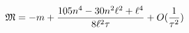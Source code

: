 \begin{equation}
{\frak M}=-m+\frac{105n^{4}-30n^{2}\ell ^{2}+\ell ^{4}}{8\ell ^{2}\tau }+O(%
\frac{1}{\tau ^{2}})  \label{totmass}
\end{equation}%
